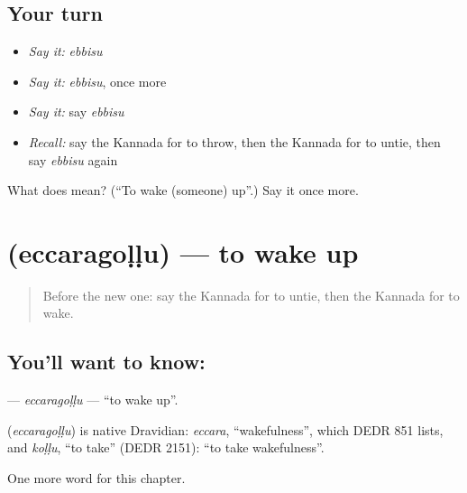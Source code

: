 \subsection*{Your turn}
\begin{itemize}
\raggedright
  \item \emph{Say it:} \emph{ebbisu}
  \item \emph{Say it:} \emph{ebbisu}, once more
  \item \emph{Say it:} say \emph{ebbisu}
  \item \emph{Recall:} say the Kannada for to throw, then the Kannada for to untie, then say \emph{ebbisu} again
\end{itemize}

\begin{tcolorbox}[breakable,colback=teal!4,colframe=teal!35!black,title={Before you move on}]
What does  mean? (\textquotedblleft{}To wake (someone) up\textquotedblright{}.) Say it once more.
\end{tcolorbox}
\section[\texorpdfstring{\kn{ಎಚ್ಚರಗೊಳ್ಳು} (eccaragoḷḷu)}{ಎಚ್ಚರಗೊಳ್ಳು (eccaragoḷḷu)}]{ (eccaragoḷḷu) — to wake up}

\label{lesson:KA-C236-eccaragollu}



\begin{quote}
Before the new one: say the Kannada for to untie, then the Kannada for to wake.
\end{quote}

\subsection*{You'll want to know: }
\textbf{} — \emph{eccaragoḷḷu} — \textquotedblleft{}to wake up\textquotedblright{}.

\begin{cousinweb}
\textbf{} (\emph{eccaragoḷḷu}) is native Dravidian: \emph{eccara}, \textquotedblleft{}wakefulness\textquotedblright{}, which DEDR 851 lists, and \emph{koḷḷu}, \textquotedblleft{}to take\textquotedblright{} (DEDR 2151): \textquotedblleft{}to take wakefulness\textquotedblright{}.
\end{cousinweb}

\begin{grammarlens}[title={What you've built}]
One more word for this chapter.
\end{grammarlens}

